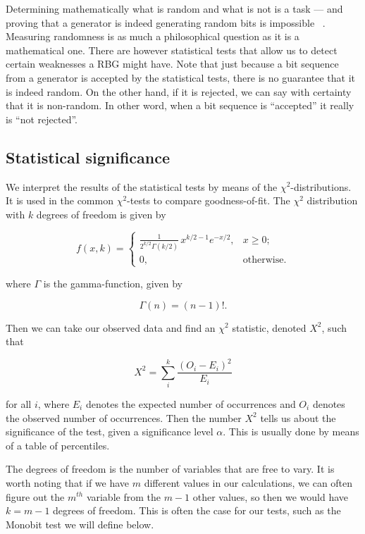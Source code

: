 \documentclass[a4paper]{article}           %
\begin{document}
Determining mathematically what is random and what is not is a task --- and proving that a generator is indeed generating random bits is impossible ~\cite{menezes1996}. Measuring randomness is as much a philosophical question as it is a mathematical one. There are however statistical tests that allow us to detect certain weaknesses a RBG might have. Note that just because a bit sequence from a generator is accepted by the statistical tests, there is no guarantee that it is indeed random. On the other hand, if it is rejected, we can say with certainty that it is non-random. In other word, when a bit sequence is ``accepted'' it really is ``not rejected''. 


\subsection{Statistical significance}

We interpret the results of the statistical tests by means of the $\chi^2$-distributions. It is used in the common $\chi^2$-tests to compare goodness-of-fit. The $\chi^2$ distribution with $k$ degrees of freedom is given by

\[
f(x, k) =
\begin{cases}
  \frac{1}{2^{k/2}\Gamma(k/2)}\,x^{k/2 - 1} e^{-x/2},  & x \geq 0; \\ 0, & \text{otherwise}.
\end{cases}
\]

where $\Gamma$ is the gamma-function, given by

\[
\Gamma(n) = (n-1)!.
\]

Then we can take our observed data and find an $\chi^2$ statistic, denoted $X^2$, such that

\[
X^2 = \sum_i^k \frac{(O_i - E_i)^2}{E_i}
\]

for all $i$, where $E_i$ denotes the expected number of occurrences and $O_i$ denotes the observed number of occurrences. Then the number $X^2$ tells us about the significance of the test, given a significance level $\alpha$. This is usually done by means of a table of percentiles. 

The degrees of freedom is the number of variables that are free to vary. It is worth noting that if we have $m$ different values in our calculations, we can often figure out the $m^{th}$ variable from the $m-1$ other values, so then we would have $k=m-1$ degrees of freedom. This is often the case for our tests, such as the Monobit test we will define below.
\end{document}
